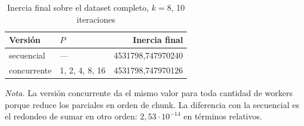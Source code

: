 \begin{table}[H]
\caption{Inercia final sobre el dataset completo, $k=8$, 10 iteraciones}\label{tab:inercias}
\small
\begin{tabular}{@{}llr@{}}
\toprule
\textbf{Versión} & \textbf{$P$} & \textbf{Inercia final} \\
\midrule
secuencial & --- & 4531798,747970240 \\
concurrente & 1, 2, 4, 8, 16 & 4531798,747970126 \\
\bottomrule
\end{tabular}

{\footnotesize\textit{Nota.} La versión concurrente da el mismo valor para toda cantidad de workers porque reduce los parciales en orden de chunk. La diferencia con la secuencial es el redondeo de sumar en otro orden: $2{,}53 \cdot 10^{-14}$ en términos relativos.\par}
\end{table}
